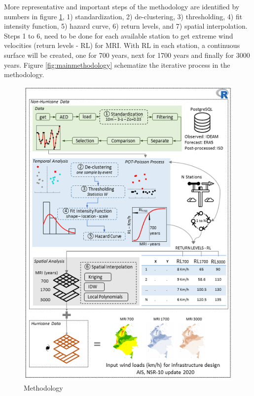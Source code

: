 \documentclass[12pt,oneside]{reedthesis}
\begin{document}
More representative and important steps of the methodology are identified by numbers in figure \ref{fig:methodology}, 1) standardization, 2) de-clustering, 3) thresholding, 4) fit intensity function, 5) hazard curve, 6) return levels, and 7) spatial interpolation. Steps 1 to 6, need to be done for each available station to get extreme wind velocities (return levels - RL) for MRI. With RL in each station, a continuous surface will be created, one for 700 years, next for 1700 years and finally for 3000 years. Figure \ref{fig:mainmethodology} schematize the iterative process in the methodology.
\begin{figure}

{\centering \includegraphics[width=6.26in]{figure/methodology} 

}

\caption{Methodology}\label{fig:methodology}
\end{figure}
\end{document}
